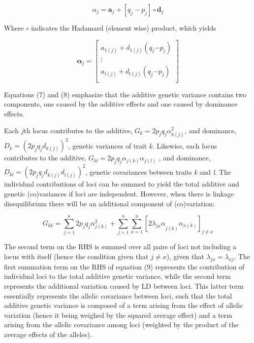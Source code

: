 \begin{refsection}
\begin{equation}
\alpha_{j} = \textbf{a}_{j} + \left\lbrack q_{j} - p_{j} \right\rbrack \circ \textbf{d}_{j}
\end{equation}

Where \(\circ\) indicates the Hadamard (element wise) product, which
yields

\begin{equation}
\mathbf{\alpha}_{j}\mathbf{=}\begin{bmatrix}
a_{1(j)} + d_{1(j)}(q_{j}{- p}_{j}) \\
 \vdots \\
a_{t(j)} + d_{t(j)}(q_{j}{- p}_{j}) \\
\end{bmatrix}
\end{equation}

Equations (7) and (8) emphasize that the additive genetic variance
contains two components, one caused by the additive effects and one
caused by dominance effects.

Each $j$th locus contributes to the additive,
\(G_{k} = 2p_{j}q_{j}\alpha_{k(j)}^{2}\), and
dominance, \(D_{k} = \left( 2p_{j}q_{j}d_{k(j)} \right)^{2}\), genetic
variances of trait \emph{k.} Likewise, each locus contributes to the
additive, \(G_{kl} = 2p_{j}q_{j}\alpha_{j(k)}\alpha_{j(l)}\) ,
and dominance,
\(D_{kl} = \left( 2p_{j}q_{j}d_{k(j)}d_{l(j)} \right)^{2}\),
genetic covariances between traits \emph{k} and \emph{l}. The individual
contributions of loci can be summed to yield the total additive and
genetic (co)variances if loci are independent. However, when there is
linkage disequilibrium there will be an additional component of
(co)variation:

\begin{equation}
G_{kk} = \sum_{j=1}^n 2p_{j}q_{j}\alpha_{j(k)}^{2} + \sum_{j=1}^n \sum_{x=1}^n \left\lbrack {2\lambda_{jx}\alpha}_{j(k)}\alpha_{x(k)} \right\rbrack_{j \neq x}
\end{equation}

The second term on the RHS is summed over all pairs of loci not
including a locus with itself (hence the condition given that
\(j \neq x\)), given that \(\lambda_{jx} = \lambda_{xj}\).
The first summation term on the RHS of equation (9) represents the
contribution of individual loci to the total additive genetic variance,
while the second term represents the additional variation caused by LD
between loci. This latter term essentially represents the allelic
covariance between loci, such that the total additive genetic variance
is composed of a term arising from the effect of allelic variation
(hence it being weighed by the squared average effect) and a term
arising from the allelic covariance among loci (weighted by the product
of the average effects of the alleles).


\end{refsection}
